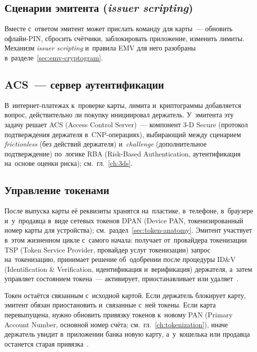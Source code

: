 \subsection*{Сценарии эмитента (\textit{issuer scripting})}

Вместе с~ответом эмитент может прислать команду для карты~--- обновить
офлайн-PIN, сбросить счётчики, заблокировать приложение, изменить лимиты.
Механизм \textit{issuer scripting} и~правила EMV для него разобраны
в~разделе~\ref{sec:emv-cryptogram}.

\subsection*{ACS~--- сервер аутентификации}

В~интернет-платежах к~проверке карты, лимита и~криптограммы добавляется
вопрос, действительно ли покупку инициировал держатель. У~эмитента
эту задачу решает ACS (Access Control Server)~--- компонент 3-D Secure
(протокол подтверждения держателя в~CNP-операциях), выбирающий между сценарием
\textit{frictionless} (без действий держателя) и~\textit{challenge} (дополнительное
подтверждение) по~логике RBA (Risk-Based Authentication, аутентификация
на~основе оценки риска); см.~гл.~\ref{ch:3ds}.

\subsection*{Управление токенами}

После выпуска карты её реквизиты хранятся на~пластике, в~телефоне, в~браузере
и~у~продавца в~виде сетевых токенов DPAN (Device PAN, токенизированный номер
карты для устройства); см.~раздел~\ref{sec:token-anatomy}. Эмитент участвует
в~этом жизненном цикле с~самого начала: получает от~провайдера токенизации TSP
(Token Service Provider, провайдер услуг токенизации) запрос на~токенизацию,
принимает решение об~одобрении после процедуры ID\&V (Identification \&
Verification, идентификация и~верификация) держателя, а~затем управляет
состоянием токена~--- активирует, приостанавливает или
удаляет~\cite{emvco-payment-tokenisation,visa-vts,nspk-tsp}.

Токен остаётся связанным с~исходной картой. Если держатель блокирует карту,
эмитент обязан приостановить и~связанные с~ней токены. Если карта перевыпущена,
нужно обновить привязку токенов к~новому PAN (Primary Account Number, основной
номер счёта; см.~гл.~\ref{ch:tokenization}), иначе держатель увидит
в~приложении банка новую карту, а~у~кошелька или продавца останется старая
привязка~\cite{emvco-payment-tokenisation,visa-vts}.

